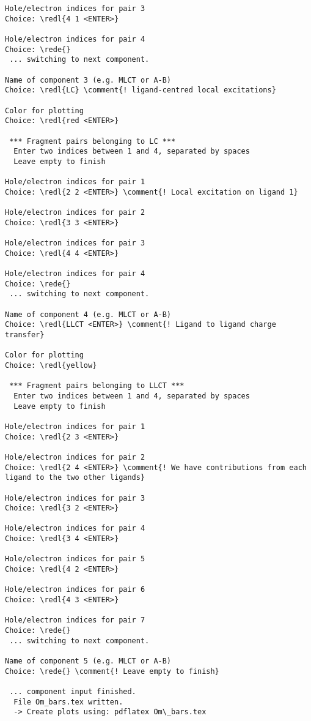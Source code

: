 \documentclass[DIV=12,headings=normal]{scrartcl}
\newcommand{\comment}[1]{\textcolor{blue}{#1}}
\newcommand{\redl}[1]{{\textcolor{red}{\texttt{#1}}}}
\newcommand{\rede}[1]{\redl{#1 <ENTER>}}
\begin{document}
\begin{Verbatim}[commandchars=\\\{\}]
Hole/electron indices for pair 3
Choice: \redl{4 1 <ENTER>}

Hole/electron indices for pair 4
Choice: \rede{}
 ... switching to next component.

Name of component 3 (e.g. MLCT or A-B)
Choice: \redl{LC} \comment{! ligand-centred local excitations}

Color for plotting
Choice: \redl{red <ENTER>}

 *** Fragment pairs belonging to LC ***
  Enter two indices between 1 and 4, separated by spaces
  Leave empty to finish

Hole/electron indices for pair 1
Choice: \redl{2 2 <ENTER>} \comment{! Local excitation on ligand 1}

Hole/electron indices for pair 2
Choice: \redl{3 3 <ENTER>}

Hole/electron indices for pair 3
Choice: \redl{4 4 <ENTER>}

Hole/electron indices for pair 4
Choice: \rede{}
 ... switching to next component.
 
Name of component 4 (e.g. MLCT or A-B)
Choice: \redl{LLCT <ENTER>} \comment{! Ligand to ligand charge transfer}

Color for plotting
Choice: \redl{yellow}

 *** Fragment pairs belonging to LLCT ***
  Enter two indices between 1 and 4, separated by spaces
  Leave empty to finish

Hole/electron indices for pair 1
Choice: \redl{2 3 <ENTER>}

Hole/electron indices for pair 2
Choice: \redl{2 4 <ENTER>} \comment{! We have contributions from each ligand to the two other ligands}

Hole/electron indices for pair 3
Choice: \redl{3 2 <ENTER>}

Hole/electron indices for pair 4
Choice: \redl{3 4 <ENTER>}

Hole/electron indices for pair 5
Choice: \redl{4 2 <ENTER>}

Hole/electron indices for pair 6
Choice: \redl{4 3 <ENTER>}

Hole/electron indices for pair 7
Choice: \rede{}
 ... switching to next component.

Name of component 5 (e.g. MLCT or A-B)
Choice: \rede{} \comment{! Leave empty to finish}

 ... component input finished.
  File Om_bars.tex written.
  -> Create plots using: pdflatex Om\_bars.tex
\end{Verbatim}
\normalsize
\end{document}
